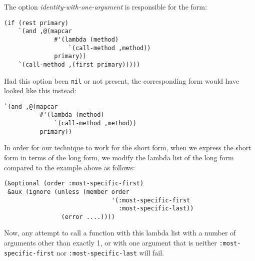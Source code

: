 \noindent
The option \textit{identity-with-one-argument} is responsible for the
form:

{\small\begin{verbatim}
(if (rest primary)
    `(and ,@(mapcar
              #'(lambda (method)
                  `(call-method ,method))
              primary))
    `(call-method ,(first primary)))))
\end{verbatim}}

\noindent
Had this option been \texttt{nil} or not present, the corresponding
form would have looked like this instead:

{\small\begin{verbatim}
`(and ,@(mapcar
          #'(lambda (method)
              `(call-method ,method))
          primary))
\end{verbatim}}

\noindent
In order for our technique to work for the short form, when we express
the short form in terms of the long form, we modify the lambda list of
the long form compared to the example above as follows:

{\small\begin{verbatim}
(&optional (order :most-specific-first)
 &aux (ignore (unless (member order
                              '(:most-specific-first
                                :most-specific-last))
                (error ....))))
\end{verbatim}}

\noindent
Now, any attempt to call a function with this lambda list with
a number of arguments other than exactly 1, or with one argument that
is neither \texttt{:most-specific-first} nor
\texttt{:most-specific-last} will fail.
